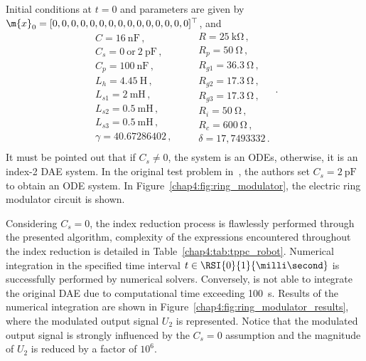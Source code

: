 %
Initial conditions at $t = 0$ and parameters are given by $\m{x}_0 = [0, 0, 0, 0, 0, 0, 0, 0, 0, 0, 0, 0, 0, 0, 0]^\top$, and
%
\begin{equation*}
  \begin{array}{l}
    C = \SI{16}{\nano\farad} \, \text{,} \\
    C_s = 0~\text{or}~\SI{2}{\pico\farad} \, \text{,} \\
    C_p = \SI{100}{\nano\farad} \, \text{,} \\
    L_h = \SI{4.45}{\henry} \, \text{,} \\
    L_{s1} = \SI{2}{\milli\henry} \, \text{,} \\
    L_{s2} = \SI{0.5}{\milli\henry} \, \text{,} \\
    L_{s3} = \SI{0.5}{\milli\henry} \, \text{,} \\
    \gamma = 40.67286402 \, \text{,} \\
  \end{array}
  \qquad
  \begin{array}{l}
    R = \SI{25}{\kilo\ohm} \, \text{,} \\
    R_p = \SI{50}{\ohm} \, \text{,} \\
    R_{g1} = \SI{36.3}{\ohm} \, \text{,} \\
    R_{g2} = \SI{17.3}{\ohm} \, \text{,} \\
    R_{g3} = \SI{17.3}{\ohm} \, \text{,} \\
    R_{i} = \SI{50}{\ohm} \, \text{,} \\
    R_{c} = \SI{600}{\ohm} \, \text{,} \\
    \delta = 17,7493332 \, \text{.} \\
  \end{array} \, \text{.}
\end{equation*}
%
It must be pointed out that if $C_s \neq 0$, the system is an \acp{ODE}, otherwise, it is an index-2 \ac{DAE} system. In the original test problem in~\cite{lioen1998test, mazzia2008test}, the authors set $C_s = \SI{2}{\pico\farad}$ to obtain an \ac{ODE} system. In Figure~\ref{chap4:fig:ring_modulator}, the electric ring modulator circuit is shown.

Considering $C_s = 0$, the index reduction process is flawlessly performed through the presented algorithm, complexity of the expressions encountered throughout the index reduction is detailed in Table~\ref{chap4:tab:tppc_robot}. Numerical integration in the specified time interval $t \in \RSI{0}{1}{\milli\second}$ is successfully performed by \Indigo{} numerical solvers. Conversely, \Maple{} is not able to integrate the original \ac{DAE} due to computational time exceeding \SI{100}{\second}. Results of the numerical integration are shown in Figure~\ref{chap4:fig:ring_modulator_results}, where the modulated output signal $U_2$ is represented. Notice that the modulated output signal is strongly influenced by the $C_s = 0$ assumption and the magnitude of $U_2$ is reduced by a factor of $10^6$.

